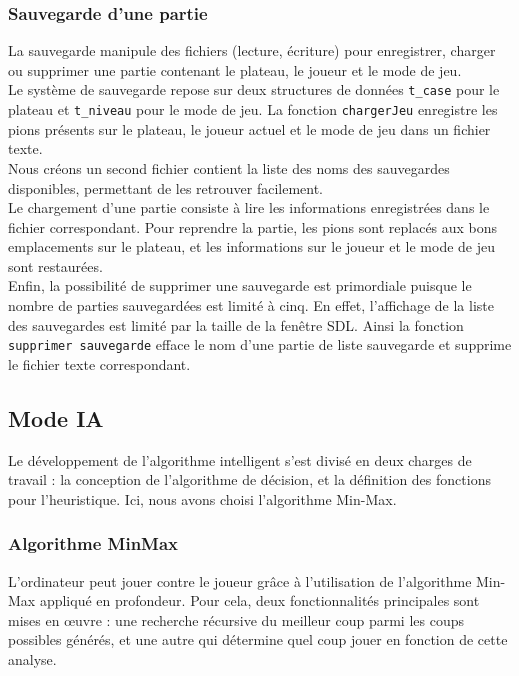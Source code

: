 \documentclass[12pt, a4paper, oneside]{article}
\begin{document}
    \subsubsection{Sauvegarde d'une partie}
    La sauvegarde manipule des fichiers (lecture, écriture) pour enregistrer, charger ou supprimer une partie contenant le plateau, le joueur et le mode de jeu.\\
    
    Le système de sauvegarde repose sur deux structures de données \texttt{t\_case} pour le plateau et \texttt{t\_niveau} pour le mode de jeu. La fonction \texttt{chargerJeu} enregistre les pions présents sur le plateau, le joueur actuel et le mode de jeu dans un fichier texte.\\

    Nous créons un second fichier contient la liste des noms des sauvegardes disponibles, permettant de les retrouver facilement.\\

    Le chargement d'une partie consiste à lire les informations enregistrées dans le fichier correspondant. Pour reprendre la partie, les pions sont replacés aux bons emplacements sur le plateau, et les informations sur le joueur et le mode de jeu sont restaurées.\\
    
    Enfin, la possibilité de supprimer une sauvegarde est primordiale puisque le nombre de parties sauvegardées est limité à cinq. En effet, l'affichage de la liste des sauvegardes est limité par la taille de la fenêtre SDL. Ainsi la fonction \texttt{supprimer\textunderscore
    sauvegarde} efface le nom d'une partie de liste\textunderscore
    sauvegarde et supprime le fichier texte correspondant.
    

    \subsection{Mode IA}
    Le développement de l'algorithme intelligent s'est divisé en deux charges de travail : la conception de l'algorithme de décision,
    et la définition des fonctions pour l'heuristique. Ici, nous avons choisi l'algorithme Min-Max.

        \subsubsection{Algorithme MinMax}
        L'ordinateur peut jouer contre le joueur grâce à l'utilisation de l'algorithme Min-Max appliqué en profondeur. Pour cela, deux fonctionnalités principales sont mises en œuvre : une recherche récursive du meilleur coup parmi les coups possibles générés, et une autre qui détermine quel coup jouer en fonction de cette analyse. \\
\end{document}
